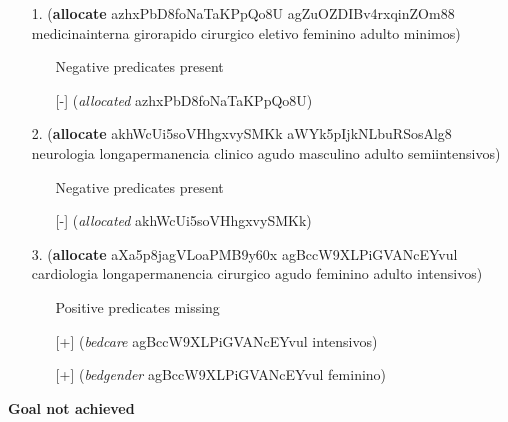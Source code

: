 \documentclass{article}
\begin{document}
\begin{itemize}
\item[1.] (\textbf{allocate} azhxPbD8foNaTaKPpQo8U agZuOZDIBv4rxqinZOm88 medicinainterna girorapido cirurgico eletivo feminino adulto minimos)
\begin{itemize}
	\item[\textbullet] Negative predicates present
	\item[\textbullet] [-] (\textit{allocated} azhxPbD8foNaTaKPpQo8U)
\end{itemize}
\item[2.] (\textbf{allocate} akhWcUi5soVHhgxvySMKk aWYk5pIjkNLbuRSosAlg8 neurologia longapermanencia clinico agudo masculino adulto semiintensivos)
\begin{itemize}
	\item[\textbullet] Negative predicates present
	\item[\textbullet] [-] (\textit{allocated} akhWcUi5soVHhgxvySMKk)
\end{itemize}
\item[3.] (\textbf{allocate} aXa5p8jagVLoaPMB9y60x agBccW9XLPiGVANcEYvul cardiologia longapermanencia cirurgico agudo feminino adulto intensivos)
\begin{itemize}
	\item[\textbullet] Positive predicates missing
	\item[\textbullet] [+] (\textit{bedcare} agBccW9XLPiGVANcEYvul intensivos)
	\item[\textbullet] [+] (\textit{bedgender} agBccW9XLPiGVANcEYvul feminino)
\end{itemize}
\end{itemize}

\hline
\vspace{10pt}
\large \textbf{Goal not achieved}
\end{document}
